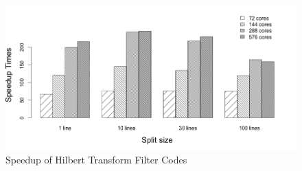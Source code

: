 \begin{figure}[!ht]
\centering
\includegraphics[scale=.50]{figures/HtfSpeedup.png}
\caption{Speedup of Hilbert Transform Filter Codes}
\label{HtfSpeedup}
\end{figure}


